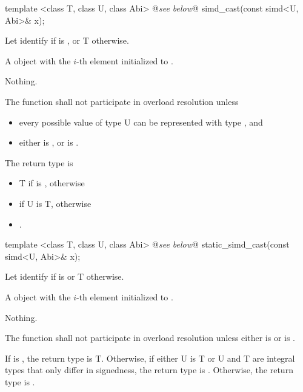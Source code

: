 \begin{itemdecl}
  template <class T, class U, class Abi> @\emph{see below}@ simd_cast(const simd<U, Abi>& x);
\end{itemdecl}
\begin{itemdescr}
  \pnum Let  identify  if  is \true, or \type T otherwise.

  \pnum\returns A \simd object with the $i$-th element initialized to  \foralli.

  \pnum\throws Nothing.

  \pnum\remarks The function shall not participate in overload resolution unless
  \begin{itemize}
    \item every possible value of type \type U can be represented with type , and
    \item either  is \false, or  is \true.
  \end{itemize}

  \pnum
  The return type is
  \begin{itemize}
    \item \type T if  is \true, otherwise
    \item \simd[<T, Abi>] if \type U is \type T, otherwise
    \item {}.
  \end{itemize}

\end{itemdescr}

\begin{itemdecl}
template <class T, class U, class Abi> @\emph{see below}@ static_simd_cast(const simd<U, Abi>& x);
\end{itemdecl}
\begin{itemdescr}
  \pnum Let  identify  if  is \true or \type T otherwise.

  \pnum\returns A \simd object with the $i$-th element initialized to  \foralli.

  \pnum\throws Nothing.

  \pnum\remarks The function shall not participate in overload resolution unless either  is \false or  is \true.

  \pnum
  If  is \true, the return type is \type T.
  Otherwise, if either \type U is \type T or \type U and \type T are integral types that only differ in signedness, the return type is \simd[<T, Abi>].
  Otherwise, the return type is .
\end{itemdescr}

